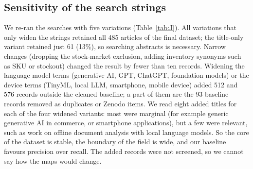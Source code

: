 \subsection{Sensitivity of the search strings}
We re-ran the searches with five variations (Table~\ref{tab:J}). All variations that only widen the strings retained all 485 articles of the final dataset; the title-only variant retained just 61 (13\%), so searching abstracts is necessary. Narrow changes (dropping the stock-market exclusion, adding inventory synonyms such as SKU or stockout) changed the result by fewer than ten records. Widening the language-model terms (generative AI, GPT, ChatGPT, foundation models) or the device terms (TinyML, local LLM, smartphone, mobile device) added 512 and 576 records outside the cleaned baseline; a part of them are the 93 baseline records removed as duplicates or Zenodo items. We read eight added titles for each of the four widened variants: most were marginal (for example generic generative AI in commerce, or smartphone applications), but a few were relevant, such as work on offline document analysis with local language models. So the core of the dataset is stable, the boundary of the field is wide, and our baseline favours precision over recall. The added records were not screened, so we cannot say how the maps would change. 


